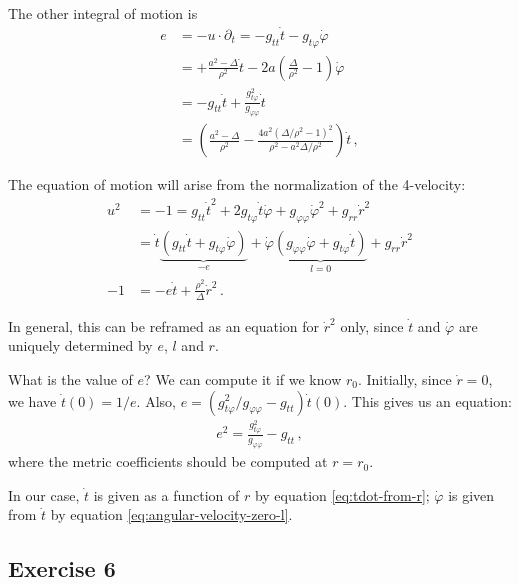 \documentclass[main.tex]{subfiles}
\begin{document}
The other integral of motion is %
\begin{align} \label{eq:tdot-from-r}
e &= - u \cdot \partial_t = - g_{tt } \dot{t} - g_{t \varphi } \dot{\varphi}  \\
&= + \frac{a^2 - \Delta }{\rho^2} \dot{t} - 2a \left(\frac{\Delta }{\rho^2} - 1\right) \dot{\varphi}  \\
&= - g_{tt} \dot{t} + \frac{g_{t \varphi }^2}{g_{\varphi \varphi}} \dot{t}  \\
&= \left(\frac{a^2 - \Delta }{\rho^2} - \frac{4 a^2 (\Delta / \rho^2 - 1)^2}{\rho^2 - a^2 \Delta / \rho^2} \right) \dot{t}
\,,
\end{align}
%

The equation of motion will arise from the normalization of the 4-velocity: %
\begin{align}
u^2 &= -1 = g_{tt} \dot{t}^2 + 2g_{t \varphi } \dot{t} \dot{\varphi} + g_{\varphi \varphi } \dot{\varphi}^2 + g_{rr} \dot{r}^2  \\
&= \dot{t} \underbrace{\left( g_{tt} \dot{t} + g_{t \varphi } \dot{\varphi}\right)}_{- e}
+ \dot{\varphi} \underbrace{\left( g_{\varphi \varphi } \dot{\varphi} + g_{t \varphi } \dot{t}\right)}_{l = 0} + g_{rr} \dot{r}^2  \\
-1 &= -e \dot{t} + \frac{\rho^2}{\Delta } \dot{r}^2
\,.
\end{align}


In general, this can be reframed as an equation for \(\dot{r}^2\) only, since \(\dot{t}\) and \(\dot{\varphi}\) are uniquely determined by \(e\), \(l\) and \(r\).

What is the value of \(e\)? We can compute it if we know \(r_0\).
Initially, since \(\dot{r} = 0\), we have \(\dot{t}(0) = 1 / e\).
Also, \(e = (g_{t \varphi }^2 / g_{\varphi \varphi } - g_{tt}) \dot{t}(0)\). This gives us an equation: %
\begin{align}
e^2 = \frac{g_{t \varphi }^2}{g_{\varphi \varphi }} - g_{tt}
\,,
\end{align}
%
where the metric coefficients should be computed at \(r = r_0\). 

In our case, \(\dot{t}\) is given as a function of \(r\) by equation \eqref{eq:tdot-from-r}; \(\dot{\varphi}\) is given from \(\dot{t}\) by equation \eqref{eq:angular-velocity-zero-l}. 


\subsection{Exercise 6}
\end{document}
